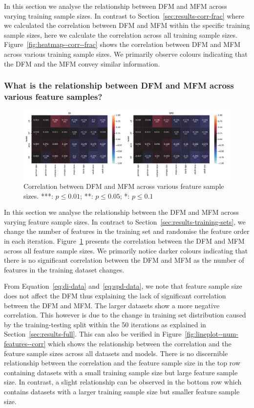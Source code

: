 \documentclass{article}
\begin{document}
In this section we analyse the relationship between DFM and MFM across
varying training sample sizes. In contrast to
Section \ref{sec:results-corr-frac} where we calculated the
correlation between DFM and MFM within the specific training sample
sizes, here we calculate the correlation across all training sample
sizes. Figure \ref{fig:heatmap--corr--frac} shows the correlation
between DFM and MFM across various training sample sizes. We primarily
observe colours indicating that the DFM and the MFM convey similar
information.

\subsubsection{What is the relationship between DFM and MFM across various feature samples?}\label{sec:results-feature-sets}

\begin{figure}
  \centering
  \includegraphics[width=0.95\linewidth]{heatmap--corr--num-features.pdf}
  \caption{Correlation between DFM and MFM across various feature
  sample sizes. ***: $p\le0.01$; **: $p\le0.05$; *: $p\le0.1$}
  \label{fig:heatmap--corr--num-features}
\end{figure}

In this section we analyse the relationship between the DFM and MFM
across varying feature sample sizes. In contract to
Section \ref{sec:results-training-sets}, we change the number of
features in the training set and randomise the feature order in each
iteration. Figure \ref{fig:heatmap--corr--num-features} presents the
correlation between the DFM and MFM across all feature sample sizes.
We primarily notice darker colours indicating that there is no
significant correlation between the DFM and MFM as the number of
features in the training dataset changes.

From Equation \ref{eq:di-data} and \ref{eq:spd-data}, we note that
feature sample size does not affect the DFM thus explaining the lack
of significant correlation between the DFM and MFM. The larger
datasets show a more negative correlation. This however is due to the
change in training set distribution caused by the training-testing
split within the 50 iterations as explained
in Section \ref{sec:results-full}. This can also be verified in
Figure \ref{fig:lineplot--num-features--corr} which shows the
relationship between the correlation and the feature sample sizes
across all datasets and models. There is no discernible relationship
between the correlation and the feature sample size in the top row
containing datasets with a small training sample size but large
feature sample size. In contrast, a slight relationship can be observed
in the bottom row which contains datasets with a larger training
sample size but smaller feature sample size.
\end{document}
